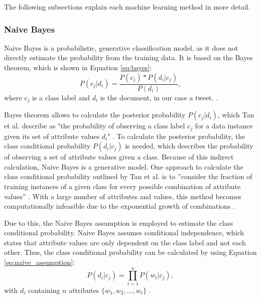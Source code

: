 The following subsections explain each machine learning method in more detail.

    \subsubsection{Naive Bayes}
        Naive Bayes is a probabilistic, generative classification model, as it does not directly estimate the probability from the training data. It is based on the Bayes theorem, which is shown in Equation \eqref{eq:bayes}:
        \begin{equation}
            \label{eq:bayes}
            P(c_j|d_i) = \frac{P(c_j) * P(d_i|c_j)}{P(d_i)},
        \end{equation}
        where $c_j$ is a class label and $d_i$ is the document, in our case a tweet. \cite{DBLP:books/aw/TanSKK2019}. 
        
        Bayes theorem allows to calculate the posterior probability $P(c_j|d_i)$, which Tan et al. describe as "the probability of observing a class label $c_j$ for a data instance given its set of attribute values $d_i$" \cite[p.~418]{DBLP:books/aw/TanSKK2019}. To calculate the posterior probability, the class conditional probability $P(d_i|c_j)$ is needed, which describes the probability of observing a set of attribute values given a class. Because of this indirect calculation, Naive Bayes is a generative model. One approach to calculate the class conditional probability outlined by Tan et al. is to ''consider the fraction of training instances of a given class for every possible combination of attribute values'' \cite[p.~419]{DBLP:books/aw/TanSKK2019}. With a large number of attributes and values, this method becomes computationally infeasible due to the exponential growth of combinations \cite{DBLP:books/aw/TanSKK2019}.

        Due to this, the Naive Bayes assumption is employed to estimate the class conditional probability. Naive Bayes assumes conditional independence, which states that attribute values are only dependent on the class label and not each other. Thus, the class conditional probability can be calculated by using Equation \eqref{eq:naive_assumption}:
        \begin{equation}
            \label{eq:naive_assumption}
            P(d_i|c_j) = \prod_{t=1}^{n}P(w_{t}|c_j),
        \end{equation}
        with $d_i$ containing $n$ attributes $\{w_1,w_2,...,w_t\}$ \cite{DBLP:books/aw/TanSKK2019}.

